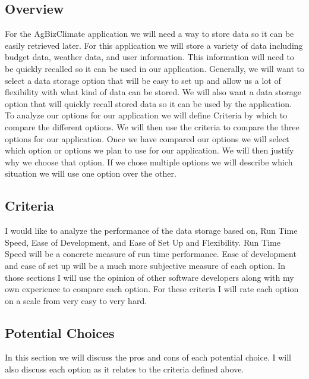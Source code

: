 \documentclass[letterpaper,10pt]{article}
\begin{document}
	\subsection{Overview}
		For the AgBizClimate application we will need a way to store data so it can be easily retrieved later. For this application we will store a variety of data including budget data, weather data, and user information. This information will need to be quickly recalled so it can be used in our application. Generally, we will want to select a data storage option that will be easy to set up and allow us a lot of flexibility with what kind of data can be stored. We will also want a data storage option that will quickly recall stored data so it can be used by the application.\\
		To analyze our options for our application we will define Criteria by which to compare the different options. We will then use the criteria to compare the three options for our application. Once we have compared our options we will select which option or options we plan to use for our application. We will then justify why we choose that option. If we chose multiple options we will describe which situation we will use one option over the other.
	\subsection{Criteria}
		I would like to analyze the performance of the data storage based on, Run Time Speed, Ease of Development, and Ease of Set Up and Flexibility. Run Time Speed will be a concrete measure of run time performance. Ease of development and ease of set up will be a much more subjective measure of each option. In those sections I will use the opinion of other software developers along with my own experience to compare each option. For these criteria I will rate each option on a scale from very easy to very hard.
	\subsection{Potential Choices}
		In this section we will discuss the pros and cons of each potential choice. I will also discuss each option as it relates to the criteria defined above. 
\end{document}
